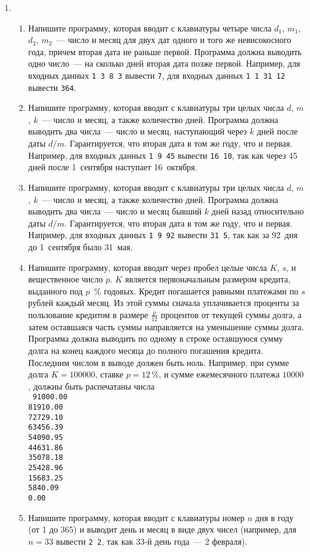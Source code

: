 \documentclass{article}
\begin{document}
\begin{enumerate}[label={}, leftmargin=0pt, itemindent=0pt]
\item

\begin{enumerate}[label=\arabic{enumi}.\arabic*.]
\item
Напишите программу, которая вводит с клавиатуры четыре числа $d_1$, $m_1$, $d_2$, $m_2$~--- число и месяц для двух дат одного и того же невисокосного года, причем вторая дата не раньше первой. Программа должна выводить одно число~--- на сколько дней вторая дата позже первой. Например, для входных данных \texttt{1 3 8 3} вывести \texttt{7}, для входных данных \texttt{1 1 31 12} вывести \texttt{364}.
\item
Напишите программу, которая вводит с клавиатуры три целых числа $d$, $m$, $k$~--- число и месяц, а также количество дней. Программа должна выводить два числа~--- число и месяц, наступающий через $k$ дней после даты $d/m$. Гарантируется, что вторая дата в том же году, что и первая. Например, для входных данных \texttt{1 9 45} вывести \texttt{16 10}, так как через 45 дней после 1~сентября наступает 16~октября.
\item
Напишите программу, которая вводит с клавиатуры три целых числа $d$, $m$, $k$~--- число и месяц, а также количество дней. Программа должна выводить два числа~--- число и месяц бывший $k$ дней назад относительно даты $d/m$. Гарантируется, что вторая дата в том же году, что и первая. Например, для входных данных \texttt{1 9 92} вывести \texttt{31 5}, так как за 92~дня до 1~сентября было 31~мая.
\item
Напишите программу, которая вводит через пробел целые числа $K$, $s$, и вещественное число $p$. $K$ является первоначальным размером кредита, выданного под $p$~\% годовых. Кредит погашается равными платежами по $s$ рублей каждый месяц. Из этой суммы сначала уплачивается проценты за пользование кредитом в размере $\frac{p}{12}$ процентов от текущей суммы долга, а затем оставшаяся часть суммы  направляется на уменьшение суммы долга. Программа должна выводить по одному в строке оставшуюся сумму долга на конец каждого месяца до полного погашения кредита. Последним числом в выводе должен быть ноль. Например, при сумме долга $K=100000$, ставке $p=12$\,\%, и сумме ежемесячного платежа $10000$, должны быть распечатаны числа\\
\texttt{
91000.00\\
81910.00\\
72729.10\\
63456.39\\
54090.95\\
44631.86\\
35078.18\\
25428.96\\
15683.25\\
5840.09\\
0.00}
\item
Напишите программу, которая вводит с клавиатуры номер $n$ дня в году (от 1 до 365) и выводит день и месяц в виде двух чисел (например, для $n=33$ вывести \texttt{2 2}, так как 33-й день года~--- 2 февраля).


\end{enumerate}
\end{enumerate}
\end{document}
